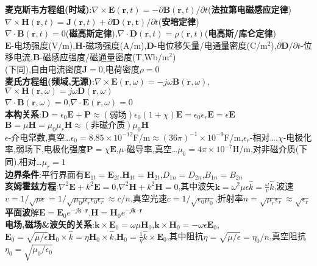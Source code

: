 \documentclass[a4paper,10pt]{article}
\begin{document}
\scriptsize
\begin{multicols}{2}
\noindent\textbf{麦克斯韦方程组(时域)}:$\nabla\times\bm{E}(\bm{r},t)=-\partial\bm{B}(\bm{r},t)/\partial t$(\textbf{法拉第电磁感应定律})\\
\indent$\nabla\times\bm{H}(\bm{r},t)=\bm{J}(\bm{r},t)+\partial\bm{D(\bm{r},t)}/\partial t$(\textbf{安培定律})\\
\indent$\nabla\cdot\bm{B}(\bm{r},t)=0$(\textbf{磁高斯定律}),\qquad$\nabla\cdot\bm{D}(\bm{r},t)=\rho(\bm{r},t)$(\textbf{电高斯/库仑定律})\\
$\bm{E}$-电场强度(V/m),$\bm{H}$-磁场强度(A/m),$\bm{D}$-电位移矢量/电通量密度(C/m$^2$),$\partial\bm{D}/\partial t$-位移电流,$\bm{B}$-磁感应强度/磁通量密度(T,Wb/m$^2$)\\
(下同),自由电流密度$\bm{J}=0$,电荷密度$\rho=0$\\
\textbf{麦氏方程组(频域,无源)}:$\nabla\times\bm{E}(\bm{r},\omega)=-j\omega\bm{B}(\bm{r},\omega)$,\qquad$\nabla\times\bm{H}(\bm{r},\omega)=j\omega\bm{D}(\bm{r},\omega)$\\
\indent$\nabla\cdot\bm{B}(\bm{r},\omega)=0$,\qquad\indent$\nabla\cdot\bm{E}(\bm{r},\omega)=0$\\
\textbf{本构关系}:$\bm{D}=\epsilon_0\bm{E}+\bm{P}\approx(\text{弱场})\epsilon_0(1+\chi)\bm{E}=\epsilon_0\epsilon_r\bm{E}=\epsilon\bm{E}$\\
\indent$\bm{B}=\mu\bm{H}=\mu_0\mu_r\bm{H}\approx(\text{非磁介质})\mu_0\bm{H}$\\
$\epsilon$-介电常数,真空…$\epsilon_0=8.85\times 10^{-12}$F/m$\approx(36\pi)^{-1}\times 10^{-9}$F/m,$\epsilon_r$-相对…,$\chi$-电极化率,弱场下,电极化强度$\bm{P}=\chi\bm{E}$,$\mu$-磁导率,真空…$\mu_0=4\pi\times 10^{-7}$H/m,对非磁介质(下同),相对…$\mu_r=1$\\
\textbf{边界条件}:平行界面有$\bm{E}_{1t}=\bm{E}_{2t}$,$\bm{H}_{1t}=\bm{H}_{2t}$,$D_{1n}=D_{2n}$,$B_{1n}=B_{2n}$\\
\textbf{亥姆霍兹方程}:$\nabla^2\bm{E}+k^2\bm{E}=0$,$\nabla^2\bm{H}+k^2\bm{H}=0$,其中波矢$\bm{k}=\omega^2\mu\epsilon\hat{k}=\frac{\omega}{v}\hat{k}$,波速$v=1/\sqrt{\mu\epsilon}=1/\sqrt{\mu_0\mu_r\epsilon_0\epsilon_r}\approx c/n$,真空光速$c=1/\sqrt{\epsilon_0\mu_0}$,折射率$n=\sqrt{\mu_r\epsilon_r}\approx\sqrt{\epsilon_r}$\\
\textbf{平面波}解$\bm{E}=\bm{E}_0e^{-j\bm{k}\cdot\bm{r}}$,$\bm{H}=\bm{H}_0e^{-j\bm{k}\cdot\bm{r}}$\\
\textbf{电场,磁场\&波矢的关系}:$\bm{k}\times\bm{E}_0=\omega\mu\bm{H}_0$,$\bm{k}\times\bm{H}_0=-\omega\epsilon\bm{E}_0$,$\bm{E}_0=\sqrt{\mu/\epsilon}\bm{H}_0\times\hat{k}=\eta\bm{H}_0\times\hat{k}$,$\bm{H}_0=\frac{1}{\eta}\hat{k}\times\bm{E}_0$,其中阻抗$\eta=\sqrt{\mu/\epsilon}=\eta_0/n$,真空阻抗$\eta_0=\sqrt{\mu_0/\epsilon_0}$\\

\end{multicols}
\end{document}
